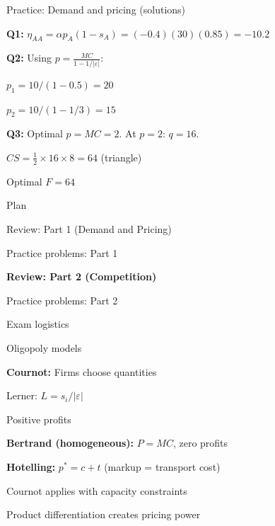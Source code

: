 \documentclass[notes,11pt, aspectratio=169]{beamer}
\newenvironment{wideitemize}{\itemize\addtolength{\itemsep}{10pt}}{\enditemize}
\newenvironment{wideenumerate}{\enumerate\addtolength{\itemsep}{10pt}}{\endenumerate}
\begin{document}
\begin{frame}{Practice: Demand and pricing (solutions)}
	\begin{wideitemize}
		\item \textbf{Q1:} $\eta_{AA} = \alpha p_A (1 - s_A) = (-0.4)(30)(0.85) = -10.2$
		\item \textbf{Q2:} Using $p = \frac{MC}{1 - 1/|\varepsilon|}$:
		\begin{wideitemize}
			\vspace{3pt}
			\item $p_1 = 10/(1 - 0.5) = 20$
			\item $p_2 = 10/(1 - 1/3) = 15$
		\end{wideitemize}
		\item \textbf{Q3:} Optimal $p = MC = 2$. At $p = 2$: $q = 16$.
		\begin{wideitemize}
			\vspace{3pt}
			\item $CS = \frac{1}{2} \times 16 \times 8 = 64$ (triangle)
			\item Optimal $F = 64$
		\end{wideitemize}
	\end{wideitemize}
\end{frame}


\begin{frame}{Plan}
  \begin{wideenumerate}
    \item Review: Part 1 (Demand and Pricing)
    \item Practice problems: Part 1
    \item \textbf{Review: Part 2 (Competition)}
    \item Practice problems: Part 2
    \item Exam logistics
  \end{wideenumerate}
\end{frame}

\begin{frame}{Oligopoly models}
	\begin{wideitemize}
		\item \textbf{Cournot:} Firms choose quantities
		\begin{wideitemize}
			\vspace{3pt}
			\item Lerner: $L = s_i / |\varepsilon|$
			\item Positive profits
		\end{wideitemize}
		\item \textbf{Bertrand (homogeneous):} $P = MC$, zero profits
		\item \textbf{Hotelling:} $p^* = c + t$ (markup = transport cost)
		\item Cournot applies with capacity constraints
		\item Product differentiation creates pricing power
	\end{wideitemize}
\end{frame}
\end{document}
